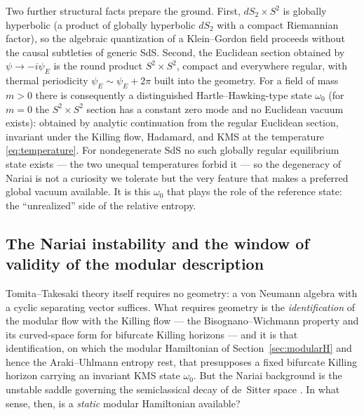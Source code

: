 \documentclass[11pt]{article}
\newcommand{\Nariai}{Nariai}
\begin{document}
Two further structural facts prepare the ground. First, $dS_2 \times S^2$ is globally hyperbolic (a product of globally hyperbolic $dS_2$ with a compact Riemannian factor), so the algebraic quantization of a Klein--Gordon field proceeds without the causal subtleties of generic SdS. Second, the Euclidean section obtained by $\psi \to -i\psi_E$ is the round product $S^2 \times S^2$, compact and everywhere regular, with thermal periodicity $\psi_E \sim \psi_E + 2\pi$ built into the geometry. For a field of mass $m>0$ there is consequently a distinguished Hartle--Hawking-type state $\omega_0$ (for $m=0$ the $S^2\times S^2$ section has a constant zero mode and no Euclidean vacuum exists): obtained by analytic continuation from the regular Euclidean section, invariant under the Killing flow, Hadamard, and KMS at the temperature \eqref{eq:temperature}. For nondegenerate SdS no such globally regular equilibrium state exists --- the two unequal temperatures forbid it --- so the degeneracy of \Nariai{} is not a curiosity we tolerate but the very feature that makes a preferred global vacuum available. It is this $\omega_0$ that plays the role of the reference state: the ``unrealized'' side of the relative entropy.

\subsection{The Nariai instability and the window of validity of the modular description}
\label{sec:timescales}

Tomita--Takesaki theory itself requires no geometry: a von Neumann algebra with a cyclic separating vector suffices. What requires geometry is the \emph{identification} of the modular flow with the Killing flow --- the Bisognano--Wichmann property and its curved-space form for bifurcate Killing horizons \cite{Sewell,KayWald} --- and it is that identification, on which the modular Hamiltonian of Section~\ref{sec:modularH} and hence the Araki--Uhlmann entropy rest, that presupposes a fixed bifurcate Killing horizon carrying an invariant KMS state $\omega_0$. But the \Nariai{} background is the unstable saddle governing the semiclassical decay of de~Sitter space \cite{GinspargPerry,BoussoHawking}. In what sense, then, is a \emph{static} modular Hamiltonian available?
\end{document}
